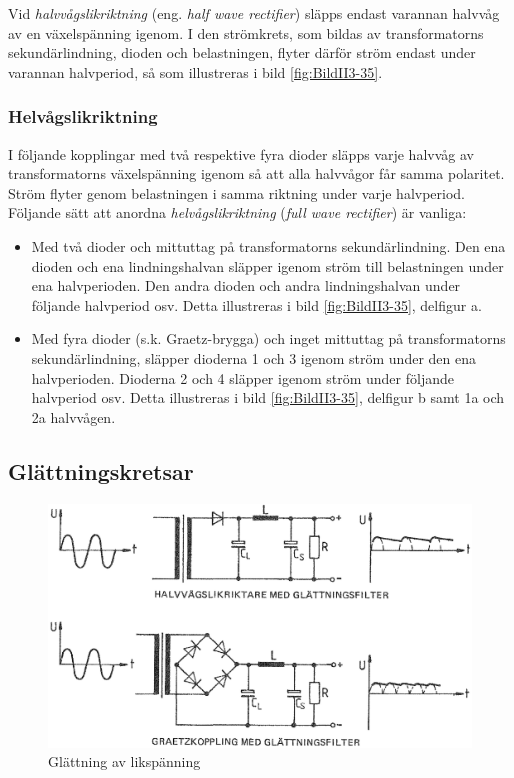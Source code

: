 Vid \emph{halvvågslikriktning} (eng. \emph{half wave rectifier}) släpps endast
varannan halvvåg av en växelspänning igenom.
I den strömkrets, som bildas av transformatorns sekundärlindning, dioden och
belastningen, flyter därför ström endast under varannan halvperiod, så som
illustreras i bild \ref{fig:BildII3-35}.

\subsubsection{Helvågslikriktning}

I följande kopplingar med två respektive fyra dioder släpps varje halvvåg av
transformatorns växelspänning igenom så att alla halvvågor får samma polaritet.
Ström flyter genom belastningen i samma riktning under varje halvperiod.
Följande sätt att anordna \emph{helvågslikriktning}
(\emph{full wave rectifier}) är vanliga:
\begin{itemize}
\item Med två dioder och mittuttag på transformatorns sekundärlindning.
  Den ena dioden och ena lindningshalvan släpper igenom ström till belastningen
  under ena halvperioden.
  Den andra dioden och andra lindningshalvan under följande halvperiod osv.
  Detta illustreras i bild \ref{fig:BildII3-35}, delfigur a.

\item Med fyra dioder (s.k. Graetz-brygga) och inget mittuttag på
  transformatorns sekundärlindning, släpper dioderna 1 och 3 igenom
  ström under den ena halvperioden.
  Dioderna 2 och 4 släpper igenom ström under följande halvperiod osv.
  Detta illustreras i bild \ref{fig:BildII3-35}, delfigur b samt 1a och 2a
  halvvågen.
\end{itemize}

\subsection{Glättningskretsar}

\begin{figure}
\includegraphics[width=\textwidth]{images/cropped_pdfs/bild_2_3-36.pdf}
\caption{Glättning av likspänning}
\label{fig:BildII3-36}
\end{figure}

